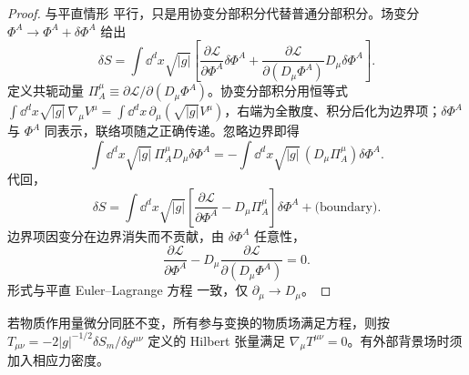 \begin{proof}
与平直情形 平行，只是用协变分部积分代替普通分部积分。场变分 $\Phi^A\to\Phi^A+\delta\Phi^A$ 给出
\begin{equation*}
\delta S=\int \dd^dx\sqrt{|g|}\left[\frac{\partial\mathcal{L}}{\partial\Phi^A}\delta\Phi^A+\frac{\partial\mathcal{L}}{\partial(D_\mu\Phi^A)}D_\mu\delta\Phi^A\right].
\end{equation*}
定义共轭动量 $\Pi_A^\mu\equiv\partial\mathcal{L}/\partial(D_\mu\Phi^A)$。协变分部积分用恒等式 $\int\dd^dx\sqrt{|g|}\,\nabla_\mu V^\mu=\int\dd^dx\,\partial_\mu(\sqrt{|g|}V^\mu)$，右端为全散度、积分后化为边界项；$\delta\Phi^A$ 与 $\Phi^A$ 同表示，联络项随之正确传递。忽略边界即得
\begin{equation*}
\int\dd^dx\sqrt{|g|}\,\Pi_A^\mu D_\mu\delta\Phi^A
=-\int\dd^dx\sqrt{|g|}\,(D_\mu\Pi_A^\mu)\delta\Phi^A.
\end{equation*}
代回，
\begin{equation*}
\delta S=\int\dd^dx\sqrt{|g|}\left[\frac{\partial\mathcal{L}}{\partial\Phi^A}-D_\mu\Pi_A^\mu\right]\delta\Phi^A+\text{(boundary)}.
\end{equation*}
边界项因变分在边界消失而不贡献，由 $\delta\Phi^A$ 任意性，
\begin{equation}\label{eq:ms-curved-EL}
\boxed{
\frac{\partial\mathcal{L}}{\partial\Phi^A}-D_\mu\frac{\partial\mathcal{L}}{\partial(D_\mu\Phi^A)}=0.
}
\end{equation}
形式与平直 Euler--Lagrange 方程 一致，仅 $\partial_\mu\to D_\mu$。
\end{proof}

\begin{proposition}[微分同胚不变性与协变守恒]
若物质作用量微分同胚不变，所有参与变换的物质场满足方程，则按 $T_{\mu\nu}=-2|g|^{-1/2}\delta S_m/\delta g^{\mu\nu}$ 定义的 Hilbert 张量满足 $\nabla_\mu T^{\mu\nu}=0$。有外部背景场时须加入相应力密度。
\end{proposition}

